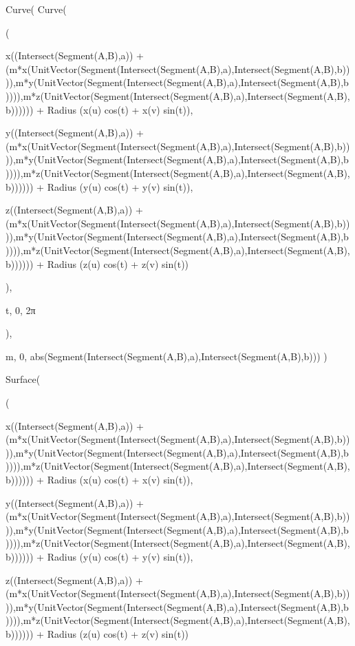 Curve(
  Curve(

    (

    x((Intersect(Segment(A,B),a)) + (m*x(UnitVector(Segment(Intersect(Segment(A,B),a),Intersect(Segment(A,B),b)))),m*y(UnitVector(Segment(Intersect(Segment(A,B),a),Intersect(Segment(A,B),b)))),m*z(UnitVector(Segment(Intersect(Segment(A,B),a),Intersect(Segment(A,B),b)))))) + Radius (x(u) cos(t) + x(v) sin(t)),

    y((Intersect(Segment(A,B),a)) + (m*x(UnitVector(Segment(Intersect(Segment(A,B),a),Intersect(Segment(A,B),b)))),m*y(UnitVector(Segment(Intersect(Segment(A,B),a),Intersect(Segment(A,B),b)))),m*z(UnitVector(Segment(Intersect(Segment(A,B),a),Intersect(Segment(A,B),b)))))) + Radius (y(u) cos(t) + y(v) sin(t)),

    z((Intersect(Segment(A,B),a)) + (m*x(UnitVector(Segment(Intersect(Segment(A,B),a),Intersect(Segment(A,B),b)))),m*y(UnitVector(Segment(Intersect(Segment(A,B),a),Intersect(Segment(A,B),b)))),m*z(UnitVector(Segment(Intersect(Segment(A,B),a),Intersect(Segment(A,B),b)))))) + Radius (z(u) cos(t) + z(v) sin(t))

    ),

    t, 0, 2π
    
    ),

    m, 0, abs(Segment(Intersect(Segment(A,B),a),Intersect(Segment(A,B),b)))
)



Surface(

    (

    x((Intersect(Segment(A,B),a)) + (m*x(UnitVector(Segment(Intersect(Segment(A,B),a),Intersect(Segment(A,B),b)))),m*y(UnitVector(Segment(Intersect(Segment(A,B),a),Intersect(Segment(A,B),b)))),m*z(UnitVector(Segment(Intersect(Segment(A,B),a),Intersect(Segment(A,B),b)))))) + Radius (x(u) cos(t) + x(v) sin(t)),

    y((Intersect(Segment(A,B),a)) + (m*x(UnitVector(Segment(Intersect(Segment(A,B),a),Intersect(Segment(A,B),b)))),m*y(UnitVector(Segment(Intersect(Segment(A,B),a),Intersect(Segment(A,B),b)))),m*z(UnitVector(Segment(Intersect(Segment(A,B),a),Intersect(Segment(A,B),b)))))) + Radius (y(u) cos(t) + y(v) sin(t)),

    z((Intersect(Segment(A,B),a)) + (m*x(UnitVector(Segment(Intersect(Segment(A,B),a),Intersect(Segment(A,B),b)))),m*y(UnitVector(Segment(Intersect(Segment(A,B),a),Intersect(Segment(A,B),b)))),m*z(UnitVector(Segment(Intersect(Segment(A,B),a),Intersect(Segment(A,B),b)))))) + Radius (z(u) cos(t) + z(v) sin(t))

